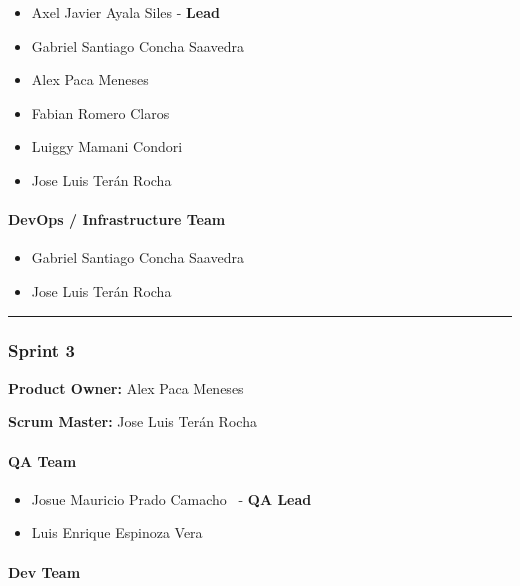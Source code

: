\begin{itemize}
\tightlist
\item
  Axel Javier Ayala Siles - \textbf{Lead}
\item
  Gabriel Santiago Concha Saavedra
\item
  Alex Paca Meneses
\item
  Fabian Romero Claros
\item
  Luiggy Mamani Condori
\item
  Jose Luis Terán Rocha
\end{itemize}

\paragraph{DevOps / Infrastructure Team}\label{devops-team-2}

\begin{itemize}
\tightlist
\item
  Gabriel Santiago Concha Saavedra
\item
  Jose Luis Terán Rocha
\end{itemize}

\begin{center}\rule{0.5\linewidth}{0.5pt}\end{center}

\hypertarget{sprint3}{
\subsubsection{\texorpdfstring{\textbf{Sprint
3}}{Sprint 3}}\label{sprint3}}

\textbf{Product Owner:}
Alex Paca Meneses

\textbf{Scrum Master:}
Jose Luis Terán Rocha

\hypertarget{qateam-3}{
\paragraph{\texorpdfstring{\textbf{QA Team}}{QA Team}}\label{qateam-3}}

\begin{itemize}
\tightlist
\item
  Josue Mauricio Prado Camacho ~- \textbf{QA Lead}
\item
  Luis Enrique Espinoza Vera
\end{itemize}

\hypertarget{devteam-3}{
\paragraph{\texorpdfstring{\textbf{Dev
Team}}{Dev Team}}\label{devteam-3}}

